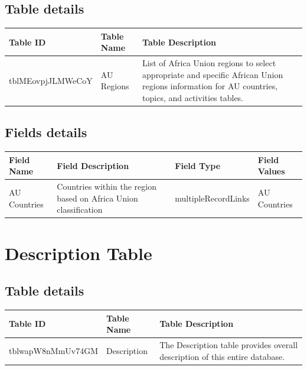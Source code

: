 \documentclass[
]{book}
\begin{document}
\hypertarget{table-details-2}{%
\subsection{Table details}\label{table-details-2}}

\begin{table}
\centering
\begin{tabular}{l|l|l}
\hline
\textbf{Table ID} & \textbf{Table Name} & \textbf{Table Description}\\
\hline
tblMEovpjJLMWeCoY & AU Regions & List of Africa Union regions to select appropriate and specific African Union regions information for AU countries, topics, and activities tables.\\
\hline
\end{tabular}
\end{table}

\hypertarget{fields-details-2}{%
\subsection{Fields details}\label{fields-details-2}}

\begin{table}
\centering
\begin{tabular}{l|l|l|l}
\hline
\textbf{Field Name} & \textbf{Field Description} & \textbf{Field Type} & \textbf{Field Values}\\
\hline
AU Countries & Countries within the region based on Africa Union classification & multipleRecordLinks & AU Countries\\
\hline
\end{tabular}
\end{table}

\hypertarget{description-table}{%
\section{Description Table}\label{description-table}}

\hypertarget{table-details-3}{%
\subsection{Table details}\label{table-details-3}}

\begin{table}
\centering
\begin{tabular}{l|l|l}
\hline
\textbf{Table ID} & \textbf{Table Name} & \textbf{Table Description}\\
\hline
tblwapW8nMmUv74GM & Description & The Description table provides overall description of this entire database.\\
\hline
\end{tabular}
\end{table}
\end{document}
